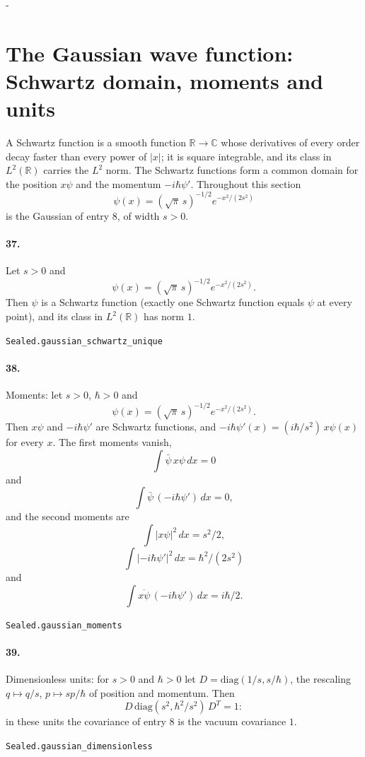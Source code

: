 \documentclass[11pt]{article}
\makeatletter
\newcommand{\keepspace}[1]{\par\penalty-100\begingroup\setlength{\dimen@}{#1}\dimen@ii\pagegoal\advance\dimen@ii-\pagetotal\ifdim\dimen@>\dimen@ii\ifdim\dimen@ii>\z@\vfil\fi\break\fi\endgroup}
\makeatother
\begin{document}
\keepspace{14\baselineskip}\section*{The Gaussian wave function: Schwartz domain, moments and units}
A Schwartz function is a smooth function $\mathbb R \to \mathbb C$ whose derivatives of every order decay faster than every power of $|x|$; it is square integrable, and its class in $L^2(\mathbb R)$ carries the $L^2$ norm. The Schwartz functions form a common domain for the position $x\psi$ and the momentum $-i\hbar\psi'$. Throughout this section \[\psi(x) = (\sqrt{\pi}\, s)^{-1/2} e^{-x^2/(2s^2)}\] is the Gaussian of entry 8, of width $s > 0$.

\paragraph{37.} Let $s > 0$ and \[\psi(x) = (\sqrt{\pi}\, s)^{-1/2} e^{-x^2/(2s^2)}.\] Then $\psi$ is a Schwartz function (exactly one Schwartz function equals $\psi$ at every point), and its class in $L^2(\mathbb R)$ has norm $1$.\par{\footnotesize\texttt{Sealed.gaussian\_schwartz\_unique}}

\paragraph{38.} Moments: let $s > 0$, $\hbar > 0$ and \[\psi(x) = (\sqrt{\pi}\, s)^{-1/2} e^{-x^2/(2s^2)}.\] Then $x\psi$ and $-i\hbar\psi'$ are Schwartz functions, and $-i\hbar\psi'(x) = (i\hbar/s^2)\, x\psi(x)$ for every $x$. The first moments vanish, \[\int \bar\psi\, x\psi\, dx = 0\] and \[\int \bar\psi\, (-i\hbar\psi')\, dx = 0,\] and the second moments are \[\int |x\psi|^2\, dx = s^2/2,\] \[\int |{-i\hbar\psi'}|^2\, dx = \hbar^2/(2s^2)\] and \[\int \overline{x\psi}\, (-i\hbar\psi')\, dx = i\hbar/2.\]\par{\footnotesize\texttt{Sealed.gaussian\_moments}}

\paragraph{39.} Dimensionless units: for $s > 0$ and $\hbar > 0$ let $D = \mathrm{diag}(1/s, s/\hbar)$, the rescaling $q \mapsto q/s$, $p \mapsto sp/\hbar$ of position and momentum. Then \[D\, \mathrm{diag}(s^2, \hbar^2/s^2)\, D^T = 1:\] in these units the covariance of entry 8 is the vacuum covariance $1$.\par{\footnotesize\texttt{Sealed.gaussian\_dimensionless}}
\end{document}
